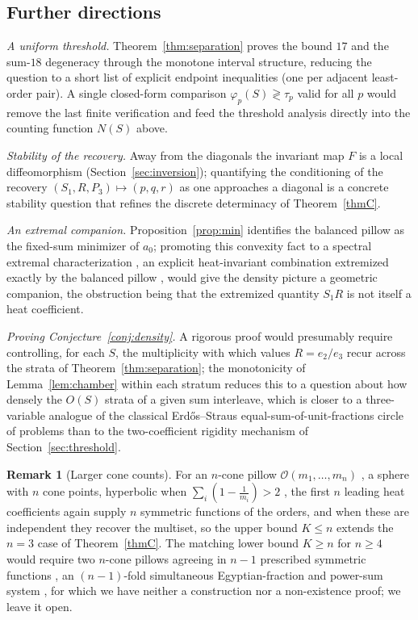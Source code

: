 \documentclass[12pt, letterpaper]{article}
\theoremstyle{definition}
\newtheorem{remark}[definition]{Remark}
\theoremstyle{plain}
\begin{document}
\subsection{Further directions}

\emph{A uniform threshold.} Theorem~\ref{thm:separation} proves the bound $17$ and the sum-$18$ degeneracy through the monotone interval structure, reducing the question to a short list of explicit endpoint inequalities (one per adjacent least-order pair). A single closed-form comparison $\varphi_p(S)\gtrless\tau_p$ valid for all $p$ would remove the last finite verification and feed the threshold analysis directly into the counting function $N(S)$ above.

\emph{Stability of the recovery.} Away from the diagonals the invariant map $F$ is a local diffeomorphism (Section~\ref{sec:inversion}); quantifying the conditioning of the recovery $(S_1,R,P_3)\mapsto(p,q,r)$ as one approaches a diagonal is a concrete stability question that refines the discrete determinacy of Theorem~\ref{thmC}.

\emph{An extremal companion.} Proposition~\ref{prop:min} identifies the balanced pillow as the fixed-sum minimizer of $a_0$; promoting this convexity fact to a spectral extremal characterization ,  an explicit heat-invariant combination extremized exactly by the balanced pillow ,  would give the density picture a geometric companion, the obstruction being that the extremized quantity $S_1R$ is not itself a heat coefficient.

\emph{Proving Conjecture~\ref{conj:density}.} A rigorous proof would presumably require controlling, for each $S$, the multiplicity with which values $R=e_2/e_3$ recur across the strata of Theorem~\ref{thm:separation}; the monotonicity of Lemma~\ref{lem:chamber} within each stratum reduces this to a question about how densely the $O(S)$ strata of a given sum interleave, which is closer to a three-variable analogue of the classical Erd\H{o}s--Straus equal-sum-of-unit-fractions circle of problems than to the two-coefficient rigidity mechanism of Section~\ref{sec:threshold}.

\begin{remark}[Larger cone counts]\label{rem:ncone}
For an $n$-cone pillow $\mathcal{O}(m_1,\dots,m_n)$ ,  a sphere with $n$ cone points, hyperbolic when $\sum_i(1-\tfrac1{m_i})>2$ ,  the first $n$ leading heat coefficients again supply $n$ symmetric functions of the orders, and when these are independent they recover the multiset, so the upper bound $K\le n$ extends the $n=3$ case of Theorem~\ref{thmC}. The matching lower bound $K\ge n$ for $n\ge4$ would require two $n$-cone pillows agreeing in $n-1$ prescribed symmetric functions ,  an $(n-1)$-fold simultaneous Egyptian-fraction and power-sum system ,  for which we have neither a construction nor a non-existence proof; we leave it open.
\end{remark}
\end{document}
